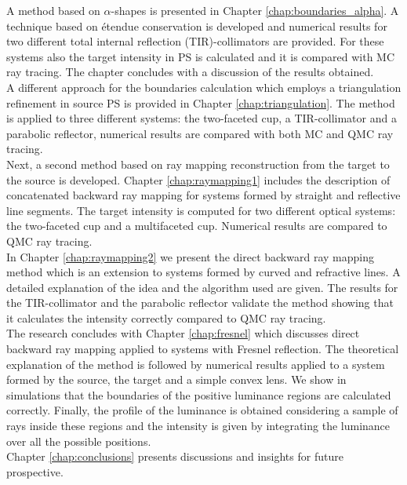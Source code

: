A method based on $\alpha$-shapes is presented in Chapter \ref{chap:boundaries_alpha}. A technique based on \'{e}tendue conservation is developed and numerical results for two different total internal reflection (TIR)-collimators are provided. For these systems also the target intensity in PS is calculated and it is compared with MC ray tracing. The chapter concludes with a discussion of the results obtained.\\ \indent
A different approach for the boundaries calculation which employs a triangulation refinement in source PS is provided in Chapter \ref{chap:triangulation}. The method is applied to three different systems: the two-faceted cup, a TIR-collimator and a parabolic reflector, numerical results are compared with both MC and QMC ray tracing.
\\ \indent Next, a second method based on ray mapping reconstruction from the target to the source is developed. Chapter \ref{chap:raymapping1} includes the description of concatenated backward ray mapping for systems formed by straight and reflective line segments. The target intensity is computed for two different optical systems: the two-faceted cup and a multifaceted cup. Numerical results are compared to QMC ray tracing. \\ \indent 
In Chapter \ref{chap:raymapping2} we present the direct backward ray mapping method which is an extension to systems formed by curved and refractive lines. A detailed explanation of the idea and the algorithm used are given. The results for the TIR-collimator and the parabolic reflector validate the method showing that it calculates the intensity correctly compared to QMC ray tracing. \\ \indent
The research concludes with Chapter \ref{chap:fresnel} which discusses direct backward ray mapping applied to systems with Fresnel reflection. The theoretical explanation of the method is followed by numerical results applied to a system formed by the source, the target and a simple convex lens. We show in simulations that the boundaries of the positive luminance regions are calculated correctly. Finally, the profile of the luminance is obtained considering a sample of rays inside these regions and the intensity is given by integrating the luminance over all the possible positions. \\ \indent Chapter \ref{chap:conclusions} presents discussions and insights for future prospective.
\clearpage{\pagestyle{empty}\cleardoublepage}
 